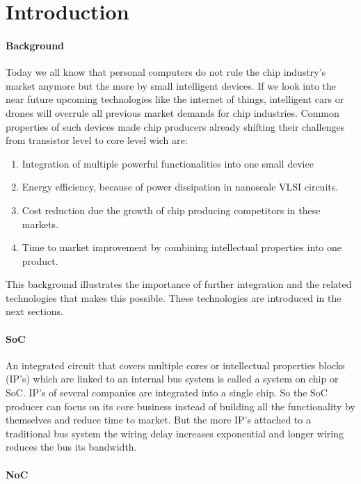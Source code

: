 \section{Introduction}

\paragraph{Background} \cite{SoC-market}

Today we all know that personal computers do not rule the chip industry's market
anymore but the more by small intelligent devices. If we look into the
near future upcoming technologies like the internet of things, intelligent cars
or drones will overrule all previous market demands for chip industries. Common
properties of such devices made chip producers already shifting their challenges
from transistor level to core level wich are:

\begin{enumerate}
\item Integration of multiple powerful functionalities into one small device
\item Energy efficiency, because of power dissipation in nanoscale VLSI circuits. 
\item Cost reduction due the growth of chip producing competitors in these markets.
\item Time to market improvement by combining intellectual properties into one product.
\end{enumerate}

This background illustrates the importance of further integration and the
related technologies that makes this possible. These technologies are introduced
in the next sections. 

\paragraph{SoC}

An integrated circuit that covers multiple cores or intellectual properties
blocks (IP's) which are linked to an internal bus system is called a system on
chip or SoC. IP's of several companies are integrated into a single chip. So the
SoC producer can focus on its core business instead of building all the
functionality by themselves and reduce time to market. But the more IP's attached
to a traditional bus system the wiring delay increases exponential and longer
wiring reduces the bus its bandwidth.\cite{SoC}

\paragraph{NoC}

